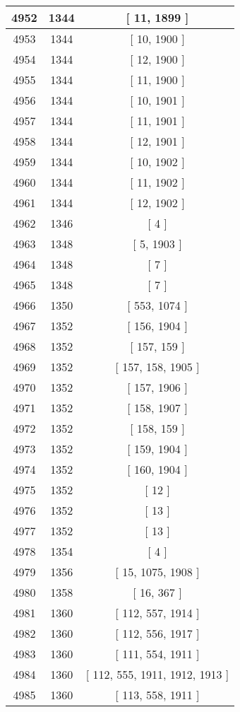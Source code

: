 \begin{center}
\begin{longtable}[H]{|| c c c ||}
\hline
4952 & 1344 & [ 11, 1899 ] \\ 
\hline
4953 & 1344 & [ 10, 1900 ] \\ 
\hline
4954 & 1344 & [ 12, 1900 ] \\ 
\hline
4955 & 1344 & [ 11, 1900 ] \\ 
\hline
4956 & 1344 & [ 10, 1901 ] \\ 
\hline
4957 & 1344 & [ 11, 1901 ] \\ 
\hline
4958 & 1344 & [ 12, 1901 ] \\ 
\hline
4959 & 1344 & [ 10, 1902 ] \\ 
\hline
4960 & 1344 & [ 11, 1902 ] \\ 
\hline
4961 & 1344 & [ 12, 1902 ] \\ 
\hline
4962 & 1346 & [ 4 ] \\ 
\hline
4963 & 1348 & [ 5, 1903 ] \\ 
\hline
4964 & 1348 & [ 7 ] \\ 
\hline
4965 & 1348 & [ 7 ] \\ 
\hline
4966 & 1350 & [ 553, 1074 ] \\ 
\hline
4967 & 1352 & [ 156, 1904 ] \\ 
\hline
4968 & 1352 & [ 157, 159 ] \\ 
\hline
4969 & 1352 & [ 157, 158, 1905 ] \\ 
\hline
4970 & 1352 & [ 157, 1906 ] \\ 
\hline
4971 & 1352 & [ 158, 1907 ] \\ 
\hline
4972 & 1352 & [ 158, 159 ] \\ 
\hline
4973 & 1352 & [ 159, 1904 ] \\ 
\hline
4974 & 1352 & [ 160, 1904 ] \\ 
\hline
4975 & 1352 & [ 12 ] \\ 
\hline
4976 & 1352 & [ 13 ] \\ 
\hline
4977 & 1352 & [ 13 ] \\ 
\hline
4978 & 1354 & [ 4 ] \\ 
\hline
4979 & 1356 & [ 15, 1075, 1908 ] \\ 
\hline
4980 & 1358 & [ 16, 367 ] \\ 
\hline
4981 & 1360 & [ 112, 557, 1914 ] \\ 
\hline
4982 & 1360 & [ 112, 556, 1917 ] \\ 
\hline
4983 & 1360 & [ 111, 554, 1911 ] \\ 
\hline
4984 & 1360 & [ 112, 555, 1911, 1912, 1913 ] \\ 
\hline
4985 & 1360 & [ 113, 558, 1911 ] \\ 

\end{longtable}
\end{center}
